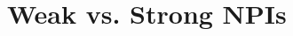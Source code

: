 \documentclass[a4paper,11pt]{article}
\begin{document}
\section{Weak vs. Strong NPIs}
\end{document}
